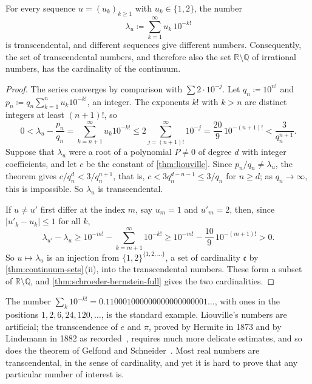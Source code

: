 \begin{corollary}
\label{cor:liouville-numbers}
For every sequence $u=(u_k)_{k\ge1}$ with $u_k\in\{1,2\}$, the number
\[
\lambda_u\coloneqq\sum_{k=1}^\infty u_k\,10^{-k!}
\]
is transcendental, and different sequences give different numbers. Consequently, the set of transcendental numbers, and therefore also the set $\mathbb R\setminus\mathbb Q$ of irrational numbers, has the cardinality of the continuum.
\end{corollary}

\begin{proof}
The series converges by comparison with $\sum2\cdot10^{-j}$. Let $q_n\coloneqq10^{n!}$ and $p_n\coloneqq q_n\sum_{k=1}^nu_k10^{-k!}$, an integer. The exponents $k!$ with $k>n$ are distinct integers at least $(n+1)!$, so
\[
0<\lambda_u-\frac{p_n}{q_n}=\sum_{k=n+1}^\infty u_k10^{-k!}\le2\sum_{j=(n+1)!}^\infty10^{-j}=\frac{20}9\,10^{-(n+1)!}<\frac3{q_n^{n+1}} .
\]
Suppose that $\lambda_u$ were a root of a polynomial $P\ne0$ of degree $d$ with integer coefficients, and let $c$ be the constant of \cref{thm:liouville}. Since $p_n/q_n\ne\lambda_u$, the theorem gives $c/q_n^d<3/q_n^{n+1}$, that is, $c<3q_n^{d-n-1}\le3/q_n$ for $n\ge d$; as $q_n\to\infty$, this is impossible. So $\lambda_u$ is transcendental.

If $u\ne u'$ first differ at the index $m$, say $u_m=1$ and $u'_m=2$, then, since $|u'_k-u_k|\le1$ for all $k$,
\[
\lambda_{u'}-\lambda_u\ge10^{-m!}-\sum_{k=m+1}^\infty10^{-k!}\ge10^{-m!}-\frac{10}9\,10^{-(m+1)!}>0 .
\]
So $u\mapsto\lambda_u$ is an injection from $\{1,2\}^{\{1,2,\ldots\}}$, a set of cardinality $\mathfrak c$ by \cref{thm:continuum-sets}\,(ii), into the transcendental numbers. These form a subset of $\mathbb R\setminus\mathbb Q$, and \cref{thm:schroeder-bernstein-full} gives the two cardinalities.
\end{proof}

The number $\sum_k10^{-k!}=0.110001000000000000000001\ldots$, with ones in the positions $1,2,6,24,120,\ldots$, is the standard example. Liouville's numbers are artificial; the transcendence of $e$ and $\pi$, proved by Hermite in 1873 and by Lindemann in 1882 as  recorded~\cite{hermite1873,lindemann1882}, requires much more delicate estimates, and so does the theorem of Gelfond and Schneider~\cite{baker1975}. Most real numbers are transcendental, in the sense of cardinality, and yet it is hard to prove that any particular number of interest is.

